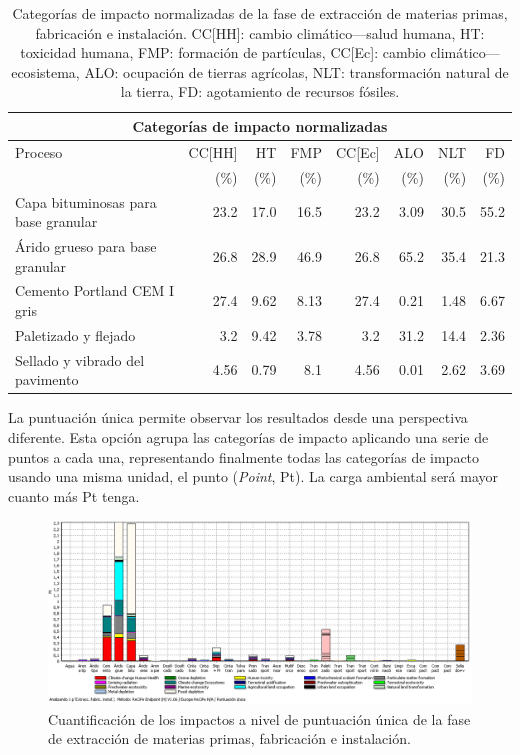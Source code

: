 \begin{table}[!htb]
\centering
\begin{tabular}{p{4cm}rrrrrrr}
\toprule
\multicolumn{8}{c}{Categorías de impacto normalizadas}\\
\midrule
Proceso & CC[HH] & HT & FMP & CC[Ec] & ALO & NLT & FD\\
 &  (\%) & (\%) & (\%) & (\%) & (\%) & (\%) & (\%)\\
\midrule
Capa bituminosas para base granular & 23.2 & 17.0 & 16.5 & 23.2 & 3.09 & 30.5 & 55.2\\
Árido grueso para base granular & 26.8 & 28.9 & 46.9 & 26.8 & 65.2 & 35.4 & 21.3\\
Cemento Portland CEM I gris & 27.4 & 9.62 & 8.13 & 27.4 & 0.21 & 1.48 & 6.67\\
Paletizado y flejado & 3.2 & 9.42 & 3.78 & 3.2 & 31.2 & 14.4 & 2.36\\
Sellado y vibrado del pavimento & 4.56 & 0.79 & 8.1 & 4.56 & 0.01 & 2.62 & 3.69\\
\bottomrule
\end{tabular}
\caption[Categorías de impacto normalizadas de la fase de extracción de materias primas, fabricación e instalación.]{Categorías de impacto normalizadas de la fase de extracción de materias primas, fabricación e instalación. CC[HH]: cambio climático—salud humana, HT: toxicidad humana, FMP: formación de partículas, CC[Ec]: cambio climático—ecosistema, ALO: ocupación de tierras agrícolas, NLT: transformación natural de la tierra, FD: agotamiento de recursos fósiles.}
\label{categoriasimpactofabricacion}
\end{table}

La puntuación única permite observar los resultados desde una perspectiva diferente. Esta opción agrupa las categorías de impacto aplicando una serie de puntos a cada una, representando finalmente todas las categorías de impacto usando una misma unidad, el punto (\textit{Point}, Pt). La carga ambiental será mayor cuanto más Pt tenga.

\begin{figure}[!htb]
\centering
\includegraphics[width=15cm]{img/fabric_puntuacionunica.png}
\caption{Cuantificación de los impactos a nivel de puntuación única de la fase de extracción de materias primas, fabricación e instalación.}
\label{fig:fabric_puntuacionunica}
\end{figure}

